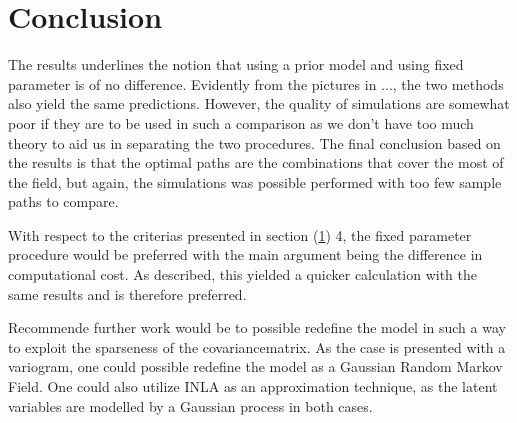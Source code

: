 \section{Conclusion}
The results underlines the notion that using a prior model and using fixed parameter is of no difference. Evidently from the pictures in ..., the two methods also yield the same predictions.  However, the quality of simulations are somewhat poor if they are to be used in such a comparison as we don't have too much theory to aid us in separating the two procedures. The final conclusion based on the results is that the optimal paths are the combinations that cover the most of the field, but again, the simulations was possible performed with too few sample paths to compare.

With respect to the criterias presented in section (\ref{}) 4, the fixed parameter procedure would be preferred with the main argument being the difference in computational cost. As described, this yielded a quicker calculation with the same results and is therefore preferred. 

Recommende further work would be to possible redefine the model in such a way to exploit the sparseness of the covariancematrix. As the case is presented with a variogram, one could possible redefine the model as a Gaussian Random Markov Field. One could also utilize INLA as an approximation technique, as the latent variables are modelled by a Gaussian process in both cases.